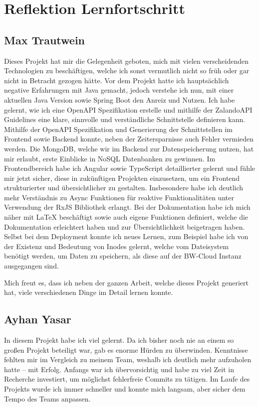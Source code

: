 \chapter{Reflektion Lernfortschritt}\label{ch:reflektion-lernfortschritt}


\section{Max Trautwein}
Dieses Projekt hat mir die Gelegenheit geboten, mich mit vielen verscheidenden Technologien zu beschäftigen,
welche ich sonst vermutlich nicht so früh oder gar nicht in Betracht gezogen hätte.
Vor dem Projekt hatte ich hauptsächlich negative Erfahrungen mit Java gemacht,
jedoch verstehe ich nun, mit einer aktuellen Java Version sowie Spring Boot den Anreiz und Nutzen.
Ich habe gelernt, wie ich eine OpenAPI Spezifikation erstelle und mithilfe der
ZalandoAPI Guidelines eine klare, sinnvolle und verständliche Schnittstelle definieren kann.
Mithilfe der OpenAPI Spezifikation und Generierung der Schnittstellen im Frontend sowie Backend
konnte, neben der Zeitersparnisse auch Fehler vermieden werden.
Die MongoDB, welche wir im Backend zur Datenspeicherung nutzen, hat mir erlaubt,
erste Einblicke in NoSQL Datenbanken zu gewinnen.
Im Frontendbereich habe ich Angular sowie TypeScript detaillierter gelernt und fühle mir jetzt sicher,
diese in zukünftigen Projekten einzusetzen, um ein Frontend strukturierter und übersichtlicher zu gestalten.
Insbesondere habe ich deutlich mehr Verständnis zu Async Funktionen für reaktive Funktionalitäten
unter Verwendung der RxJS Bibliothek erlangt.
Bei der Dokumentation habe ich mich näher mit LaTeX beschäftigt sowie auch eigene Funktionen definiert,
welche die Dokumentation erleichtert haben und zur Übersichtlichkeit beigetragen haben.
Selbst bei dem Deployment konnte ich neues Lernen, zum Beispiel habe ich von der Existenz und Bedeutung von Inodes gelernt,
welche vom Dateisystem benötigt werden, um Daten zu speichern, als diese auf der BW-Cloud Instanz ausgegangen sind.

Mich freut es, dass ich neben der ganzen Arbeit, welche dieses Projekt generiert hat,
viele verschiedenen Dinge im Detail lernen konnte.


\section{Ayhan Yasar}

In diesem Projekt habe ich viel gelernt. Da ich bisher noch nie an einem so großen Projekt beteiligt war, gab es enorme Hürden zu überwinden. 
Kenntnisse fehlten mir im Vergleich zu meinem Team, weshalb ich deutlich mehr aufzuholen hatte – mit Erfolg. 
Anfangs war ich übervorsichtig und habe zu viel Zeit in Recherche investiert, um möglichst fehlerfreie Commits zu tätigen. 
Im Laufe des Projekts wurde ich immer schneller und konnte mich langsam, aber sicher dem Tempo des Teams anpassen.

